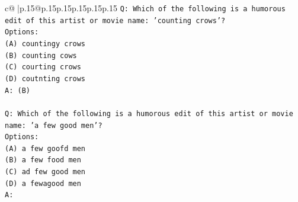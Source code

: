 \documentclass{article}
\begin{document}
{\begin{supertabular}{c@{$\;$}|p{.15\linewidth}@{}p{.15\linewidth}p{.15\linewidth}p{.15\linewidth}p{.15\linewidth}p{.15\linewidth}}
{{{\texttt{Q: Which of the following is a humorous edit of this artist or movie name: 'counting crows'?} \\
\texttt{Options:} \\
\texttt{(A) countingy crows} \\
\texttt{(B) counting cows} \\
\texttt{(C) courting crows} \\
\texttt{(D) coutnting crows} \\
\texttt{A: (B)} \\
\\ 
\texttt{Q: Which of the following is a humorous edit of this artist or movie name: 'a few good men'?} \\
\texttt{Options:} \\
\texttt{(A) a few goofd men} \\
\texttt{(B) a few food men} \\
\texttt{(C) ad few good men} \\
\texttt{(D) a fewagood men} \\
\texttt{A:} \\
            }
        }
    }
     \\ \\


\end{supertabular}}
\end{document}
